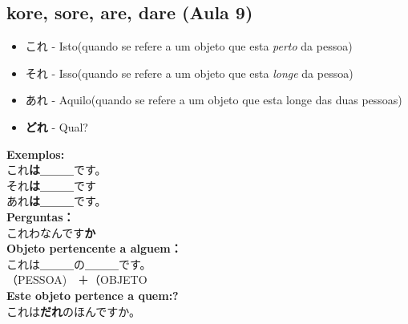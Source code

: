 \documentclass[a4paper, 12pt]{article}
\begin{document}
\subsection{kore, sore, are, dare (Aula 9)}
\begin{CJK}{UTF8}{min}

	\begin{itemize}
		\item これ - Isto(quando se refere a um objeto que esta \textit{perto} da pessoa)\\
		\item それ - Isso(quando se refere a um objeto que esta \textit{longe} da pessoa)\\
		\item あれ - Aquilo(quando se refere a um objeto que esta longe das duas pessoas)\\
		
		\item \textbf{どれ} - Qual?
		
	\end{itemize}
	
	\textbf{Exemplos:}\\
	これ\textbf{は}＿＿＿です。\\
	それ\textbf{は}＿＿＿です　\\
	あれ\textbf{は}＿＿＿です。\\
	
	\textbf{Perguntas：}\\
	これわなんです\textbf{か}\\
	
	
	
	\textbf{Objeto pertencente a alguem：}\\
	これは＿＿＿の＿＿＿です。\\（PESSOA)　＋（OBJETO \\
	
	\textbf{Este objeto pertence a quem:?}\\
	これは\textbf{だれ}のほんですか。
\end{CJK}
\end{document}
